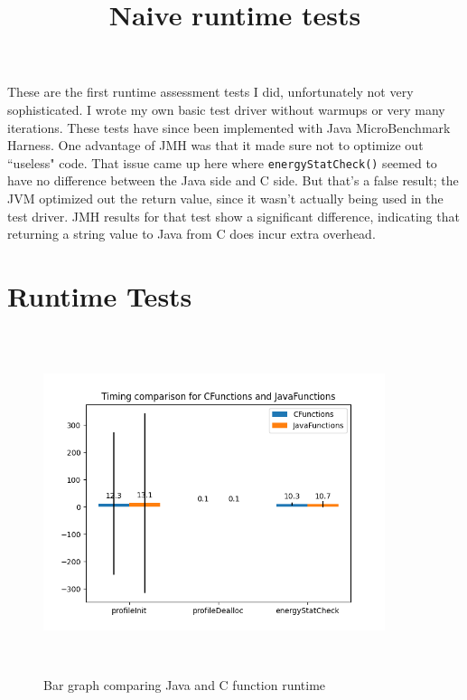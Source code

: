 \documentclass{article}
\title{Naive runtime tests}
\begin{document}
\maketitle
These are the first runtime assessment tests I did, unfortunately not
very sophisticated. I wrote my own basic test driver without warmups
or very many iterations. These tests have since been implemented with
Java MicroBenchmark Harness. One advantage of JMH was that it made sure
not to optimize out ``useless" code. That issue came up here where
\texttt{energyStatCheck()} seemed to have no difference between the Java
side and C side. But that's a false result; the JVM optimized out the return
value, since it wasn't actually being used in the test driver. JMH results
for that test show a significant difference, indicating that returning a
string value to Java from C does incur extra overhead.

\section{Runtime Tests}

\begin{figure}[H]
	\centering
	\includegraphics[width=10cm,height=10cm,keepaspectratio]{RuntimeResults_SystemC/CFunctions-JavaFunctions-bar_graph.png}
	\caption{Bar graph comparing Java and C function runtime}
	\label{fig:bar-graph||SystemC}
\end{figure}
\end{document}
